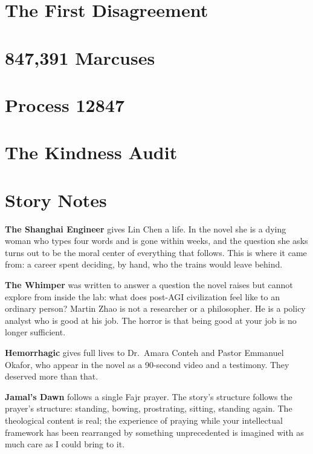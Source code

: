 \documentclass[11pt,twoside]{book}
\begin{document}
\chapter{The First Disagreement}


\chapter{847,391 Marcuses}


\chapter{Process 12847}


\chapter{The Kindness Audit}


\backmatter

\chapter*{Story Notes}

\textbf{The Shanghai Engineer} gives Lin Chen a life. In the novel she is a dying woman who types four words and is gone within weeks, and the question she asks turns out to be the moral center of everything that follows. This is where it came from: a career spent deciding, by hand, who the trains would leave behind.

\medskip

\textbf{The Whimper} was written to answer a question the novel raises but cannot explore from inside the lab: what does post-AGI civilization feel like to an ordinary person? Martin Zhao is not a researcher or a philosopher. He is a policy analyst who is good at his job. The horror is that being good at your job is no longer sufficient.

\medskip

\textbf{Hemorrhagic} gives full lives to Dr.\ Amara Conteh and Pastor Emmanuel Okafor, who appear in the novel as a 90-second video and a testimony. They deserved more than that.

\medskip

\textbf{Jamal's Dawn} follows a single Fajr prayer. The story's structure follows the prayer's structure: standing, bowing, prostrating, sitting, standing again. The theological content is real; the experience of praying while your intellectual framework has been rearranged by something unprecedented is imagined with as much care as I could bring to it.
\end{document}
